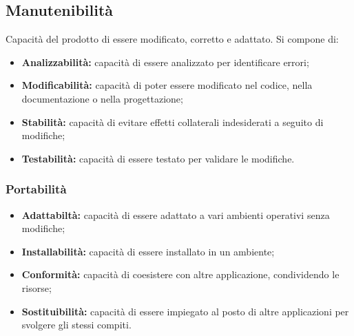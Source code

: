 \subsection{Manutenibilit\`a}
Capacit\`a del prodotto di essere modificato, corretto e adattato. Si compone di:
\begin{itemize}
    \item \textbf{Analizzabilit\`a: }capacit\`a di essere analizzato per identificare errori;
    \item \textbf{Modificabilit\`a: }capacit\`a di poter essere modificato nel codice, nella documentazione o nella progettazione;
    \item \textbf{Stabilit\`a: }capacit\`a di evitare effetti collaterali indesiderati a seguito di modifiche;
    \item \textbf{Testabilit\`a: }capacit\`a di essere testato per validare le modifiche.
\end{itemize}
\subsubsection{Portabilit\`a}
\begin{itemize}
    \item \textbf{Adattabilt\`a: }capacit\`a di essere adattato a vari ambienti operativi senza modifiche;
    \item \textbf{Installabilit\`a: }capacit\`a di essere installato in un ambiente;
    \item \textbf{Conformit\`a: }capacit\`a di coesistere con altre applicazione, condividendo le risorse;
    \item \textbf{Sostituibilit\`a: }capacit\`a di essere impiegato al posto di altre applicazioni per svolgere gli stessi compiti.
\end{itemize}